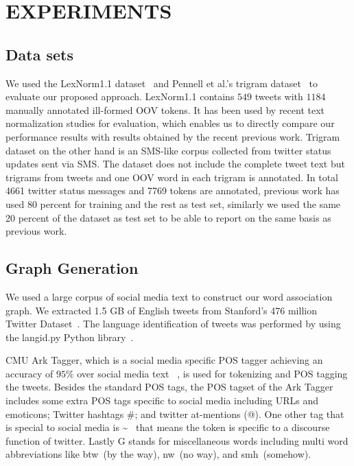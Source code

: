 \documentclass[a4paper,onesided,12pt]{report}
\begin{document}
\chapter{EXPERIMENTS}
\label{sec:experiments}

\section{Data sets}
We used the LexNorm1.1 dataset~\cite{Han:2011:LNS:2002472.2002520} and Pennell et al.'s trigram dataset~\cite{pennell2011character} to evaluate our proposed approach. LexNorm1.1 contains $549$ tweets with $1184$ manually annotated ill-formed OOV tokens. It has been used by recent text normalization studies for evaluation, which enables us to directly compare our performance results with results obtained by the recent previous work. Trigram dataset on the other hand is an SMS-like corpus collected from twitter status updates sent via SMS. The dataset does not include the complete tweet text but trigrams from tweets and one OOV word in each trigram is annotated. In total 4661 twitter status messages and 7769 tokens are annotated, previous work has used 80 percent for training and the rest as test set, similarly we used the same 20 percent of the dataset as test set to be able to report on the same basis as previous work.

\section{Graph Generation}
We used a large corpus of social media text to construct our word association graph. We extracted 1.5 GB of English tweets from Stanford's 476 million Twitter Dataset~\cite{DBLP:conf/wsdm/YangL11}. The language identification of tweets was performed by using the langid.py Python library~\cite{Lui:2012:LOL:2390470.2390475, Baldwin:2010:LIL:1857999.1858026}.

CMU Ark Tagger, which is a social media specific POS tagger achieving an accuracy of $95\%$ over social media text ~\cite{owoputi2013improved,Gimpel:2011:PTT:2002736.2002747}, is used for tokenizing and POS tagging the tweets. Besides the standard POS tags, the POS tagset of the Ark Tagger includes some extra POS tags specific to social media including URLs and emoticons; Twitter hashtags \#; and twitter at-mentions (@). One other tag that is special to social media is \textasciitilde~ that means the token is specific to a discourse function of twitter. Lastly G stands for miscellaneous words including multi word abbreviations like btw~(by the way), nw~(no way), and smh~(somehow).
\end{document}
